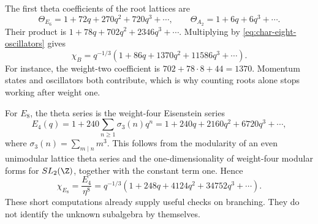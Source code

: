 The first theta coefficients of the root lattices are
\[
 \Theta_{E_6}=1+72q+270q^2+720q^3+\cdots,
 \qquad
 \Theta_{A_2}=1+6q+6q^3+\cdots.
\]
Their product is
$1+78q+702q^2+2346q^3+\cdots$. Multiplying by
\eqref{eq:char-eight-oscillators} gives
\begin{equation}
 \chi_B=q^{-1/3}(1+86q+1370q^2+11586q^3+\cdots).
 \label{eq:char-B}
\end{equation}
For instance, the weight-two coefficient is
$702+78\cdot8+44=1370$. Momentum states and oscillators both
contribute, which is why counting roots alone stops working after
weight one.

For $E_8$, the theta series is the weight-four Eisenstein series
\[
 E_4(q)=1+240\sum_{n\ge1}\sigma_3(n)q^n
       =1+240q+2160q^2+6720q^3+\cdots,
\]
where $\sigma_3(n)=\sum_{m\mid n}m^3$.
This follows from the modularity of an even unimodular lattice theta
series and the one-dimensionality of weight-four modular forms for
$SL_2(\Z)$, together with the constant term one. Hence
\begin{equation}
 \chi_{E_8}=\frac{E_4}{\eta^8}
 =q^{-1/3}(1+248q+4124q^2+34752q^3+\cdots).
 \label{eq:char-E8}
\end{equation}
These short computations already supply useful checks on branching.
They do not identify the unknown subalgebra by themselves.

